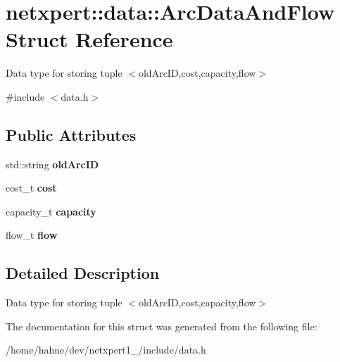 \hypertarget{structnetxpert_1_1data_1_1ArcDataAndFlow}{}\section{netxpert\+:\+:data\+:\+:Arc\+Data\+And\+Flow Struct Reference}
\label{structnetxpert_1_1data_1_1ArcDataAndFlow}


Data type for storing tuple $<$old\+Arc\+ID,cost,capacity,flow$>$  




{\ttfamily \#include $<$data.\+h$>$}

\subsection*{Public Attributes}
\begin{DoxyCompactItemize}
\item 
std\+::string {\bfseries old\+Arc\+ID}\hypertarget{structnetxpert_1_1data_1_1ArcDataAndFlow_ada75aed0c180c1e2d241dec8ae56071e}{}\label{structnetxpert_1_1data_1_1ArcDataAndFlow_ada75aed0c180c1e2d241dec8ae56071e}

\item 
cost\+\_\+t {\bfseries cost}\hypertarget{structnetxpert_1_1data_1_1ArcDataAndFlow_a87203f255baff385cddac5b29f07f92a}{}\label{structnetxpert_1_1data_1_1ArcDataAndFlow_a87203f255baff385cddac5b29f07f92a}

\item 
capacity\+\_\+t {\bfseries capacity}\hypertarget{structnetxpert_1_1data_1_1ArcDataAndFlow_a5e532aae95ddbf9cbc031f493b9abe82}{}\label{structnetxpert_1_1data_1_1ArcDataAndFlow_a5e532aae95ddbf9cbc031f493b9abe82}

\item 
flow\+\_\+t {\bfseries flow}\hypertarget{structnetxpert_1_1data_1_1ArcDataAndFlow_a19d49edb9085805efcbb55d235d3a3af}{}\label{structnetxpert_1_1data_1_1ArcDataAndFlow_a19d49edb9085805efcbb55d235d3a3af}

\end{DoxyCompactItemize}


\subsection{Detailed Description}
Data type for storing tuple $<$old\+Arc\+ID,cost,capacity,flow$>$ 

The documentation for this struct was generated from the following file\+:\begin{DoxyCompactItemize}
\item 
/home/hahne/dev/netxpert1\+\_/include/data.\+h\end{DoxyCompactItemize}
